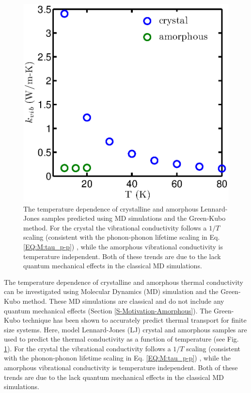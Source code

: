 \documentclass[letterpaper,12pt]{article}
\begin{document}
\begin{figure}
\begin{center}
\includegraphics[scale=1.0]{LJ_amor_GK.eps}
\vspace*{-5mm}
\end{center}
\caption{\label{FIG:LJ_amor_GK}The temperature dependence of crystalline and amorphous Lennard-Jones samples predicted using MD simulations and the Green-Kubo method.\cite{mcgaughey2004a} For the crystal the vibrational conductivity follows a $1/T$ scaling (consistent with the phonon-phonon lifetime scaling in Eq$.$ \eqref{EQ:M:tau_p-p}) , while the amorphous vibrational conductivity is temperature independent. Both of these trends are due to the lack quantum mechanical effects in the classical MD simulations. }
\end{figure}
The temperature dependence of crystalline and amorphous thermal conductivity can be investigated using Molecular Dynamics (MD) simulation and the Green-Kubo method.\cite{mcgaughey2004a} These MD simulations are classical and do not include any quantum mechanical effects (Section \ref{S-Motivation-Amorphous}). The Green-Kubo technique has been shown to accurately predict thermal transport for finite size systems.\cite{mcgaughey2004a} Here, model Lennard-Jones (LJ) crystal and amorphous samples are used to predict the thermal conductivity as a function of temperature (see Fig. 
\ref{FIG:LJ_amor_GK}).\cite{mcgaughey2004a} For the crystal the vibrational conductivity follows a $1/T$ scaling (consistent with the phonon-phonon lifetime scaling in Eq$.$ \eqref{EQ:M:tau_p-p}) , while the amorphous vibrational conductivity is temperature independent. Both of these trends are due to the lack quantum mechanical effects in the classical MD simulations.
\end{document}
